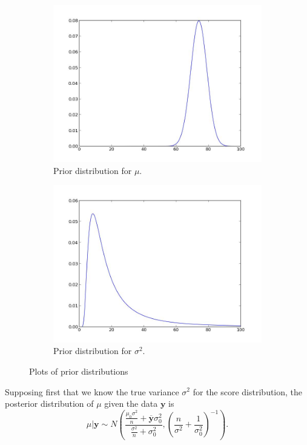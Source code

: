 \begin{figure}[h]
\centering
\begin{subfigure}[b]{.49\textwidth}
\includegraphics[width=\textwidth]{mean_prior.jpeg}
\caption{Prior distribution for $\mu$.}
\end{subfigure}
\begin{subfigure}[b]{.49\textwidth}
\includegraphics[width=\textwidth]{variance_prior.jpeg}
\caption{Prior distribution for $\sigma^{2}$.}
\end{subfigure}
\caption{Plots of prior distributions}
\end{figure}

Supposing first that we know the true variance $\sigma^{2}$ for the score distribution, the posterior distribution of $\mu$ given the data $\mathbf{y}$ is
$$\mu | \mathbf{y} \sim N\left(\frac{\frac{\mu_{0}\sigma^{2}}{n} + \overline{\mathbf{y}}\sigma_{0}^{2}}{\frac{\sigma^{2}}{n} + \sigma_{0}^{2}}, \left(\frac{n}{\sigma^{2}} + \frac{1}{\sigma_{0}^{2}}\right)^{-1}\right).$$

